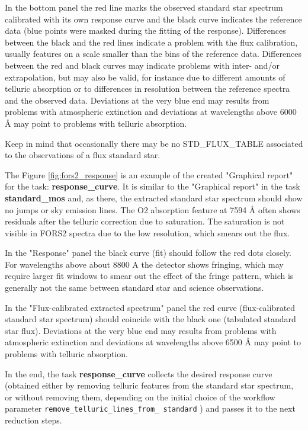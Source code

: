 In the bottom panel the red line marks the observed standard star
spectrum calibrated with its own response curve and the black curve indicates the reference data (blue points were masked during the fitting of the response). Differences between the black and
the red lines indicate a problem with the flux calibration, usually features on a scale smaller than the bins of the reference data. 
Differences between the red and black curves may indicate problems with inter- and/or extrapolation, but may also be valid, for instance due to different amounts of telluric absorption or
to differences in resolution between the reference spectra and the observed data. Deviations at the very blue end may results from problems with atmospheric extinction and deviations at wavelengths above 6000 Å may point to problems with telluric absorption.

Keep in mind that occasionally there may be no STD\_FLUX\_TABLE associated to the observations of a flux standard star.


The Figure \ref{fig:fors2_response} is an example of the created "Graphical report" for the task: {\bf response\_curve}. It is similar to the "Graphical report" in the task {\bf standard\_mos} and, as there, the extracted standard star spectrum should show no jumps or sky emission lines. The O2 absorption feature at
7594 Å often shows residuals after the telluric correction due to saturation. The saturation is not visible in FORS2 spectra due to the low resolution, which smears out the flux.

In the "Response" panel the black curve (fit) should follow the red dots closely. For wavelengths above about 8800 A the detector shows fringing, which may require larger fit windows to smear
out the effect of the fringe pattern, which is generally not the same between standard star and science observations.

In the "Flux-calibrated extracted spectrum" panel the red curve (flux-calibrated standard star spectrum) should
coincide with the black one (tabulated standard star flux). Deviations at the very blue end may results from
problems with atmospheric extinction and deviations at wavelengths above 6500 Å may point to problems with telluric absorption.

In the end, the task {\bf response\_curve} collects the desired response curve (obtained either by removing telluric features from the standard star spectrum, or without removing them, depending on the initial choice of the 
 workflow parameter {\tt remove\_telluric\_lines\_from\_ standard}
) and passes it to the next reduction steps.

